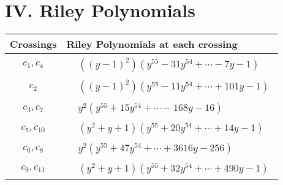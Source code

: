 \documentclass[1p]{elsarticle_modified}
\theoremstyle{definition}
\begin{document}
\centering \section*{ IV. Riley Polynomials}
\begin{tabular}{m{50pt}|m{274pt}}
Crossings & \hspace{64pt}Riley Polynomials at each crossing \\
\hline $$\begin{aligned}c_{1},c_{4}\end{aligned}$$&$\begin{aligned}
&((y-1)^2)(y^{55}-31 y^{54}+\cdots-7 y-1)
\end{aligned}$\\
\hline $$\begin{aligned}c_{2}\end{aligned}$$&$\begin{aligned}
&((y-1)^2)(y^{55}-11 y^{54}+\cdots+101 y-1)
\end{aligned}$\\
\hline $$\begin{aligned}c_{3},c_{7}\end{aligned}$$&$\begin{aligned}
&y^2(y^{55}+15 y^{54}+\cdots-168 y-16)
\end{aligned}$\\
\hline $$\begin{aligned}c_{5},c_{10}\end{aligned}$$&$\begin{aligned}
&(y^2+y+1)(y^{55}+20 y^{54}+\cdots+14 y-1)
\end{aligned}$\\
\hline $$\begin{aligned}c_{6},c_{8}\end{aligned}$$&$\begin{aligned}
&y^2(y^{55}+47 y^{54}+\cdots+3616 y-256)
\end{aligned}$\\
\hline $$\begin{aligned}c_{9},c_{11}\end{aligned}$$&$\begin{aligned}
&(y^2+y+1)(y^{55}+32 y^{54}+\cdots+490 y-1)
\end{aligned}$\\
\hline
\end{tabular}
\vskip 2pc
\end{document}
